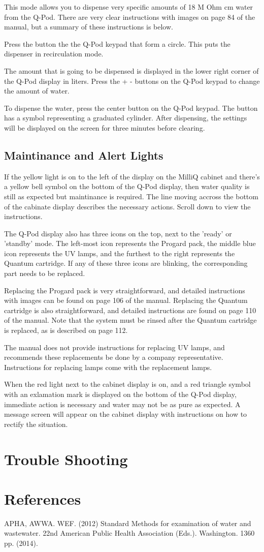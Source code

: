 \documentclass[12pt]{../SOP3_beta}
\begin{document}
\NP This mode allows you to dispense very specific amounts of 18 M Ohm cm water from the Q-Pod. There are very clear instructions with images on page 84 of the manual, but a summary of these instructions is below.

\NP Press the button the the Q-Pod keypad that form a circle. This puts the dispenser in recirculation mode. 

\NP The amount that is going to be dispensed is displayed in the lower right corner of the Q-Pod display in liters. Press the + - buttons on the Q-Pod keypad to change the amount of water. 

\NP To dispense the water, press the center button on the Q-Pod keypad. The button has a symbol representing a graduated cylinder. After dispensing, the settings will be displayed on the screen for three minutes before clearing.

\subsection{Maintinance and Alert Lights}

\NP If the yellow light is on to the left of the display on the MilliQ cabinet and there's a yellow bell symbol on the bottom of the Q-Pod display, then water quality is still as expected but maintinance is required. The line moving accross the bottom of the cabinate display describes the necessary actions. Scroll down to view the instructions. 

\NP The Q-Pod display also has three icons on the top, next to the 'ready' or 'standby' mode. The left-most icon represents the Progard pack, the middle blue icon represents the UV lamps, and the furthest to the right represents the Quantum cartridge. If any of these three icons are blinking, the corresponding part needs to be replaced.

\NP Replacing the Progard pack is very straightforward, and detailed instructions with images can be found on page 106 of the manual. Replacing the Quantum cartridge is also straightforward, and detailed instructions are found on page 110 of the manual. Note that the system must be rinsed after the Quantum cartridge is replaced, as is described on page 112. 

\NP The manual does not provide instructions for replacing UV lamps, and recommends these replacements be done by a company representative. Instructions for replacing lamps come with the replacement lamps.

\NP When the red light next to the cabinet display is on, and a red triangle symbol with an exlamation mark is displayed on the bottom of the Q-Pod display, immediate action is necessary and water may not be as pure as expected. A message screen will appear on the cabinet display with instructions on how to rectify the situation. 

\section{Trouble Shooting}

\section{References}

\NP APHA, AWWA. WEF. (2012) Standard Methods for examination of water and wastewater. 22nd American Public Health Association (Eds.). Washington. 1360 pp. (2014).
\end{document}
